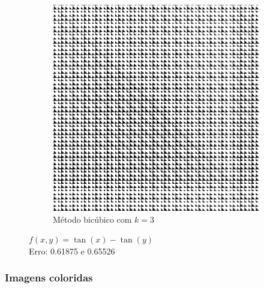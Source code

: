 \documentclass[leqno]{article}
\begin{document}
\begin{figure}[H]
\begin{subfigure}{.33\textwidth}
        \includegraphics[width=.7\linewidth]{../images/func_2_bic.png}
        \caption{Método bicúbico com $k = 3$}
        \label{fig:sub1}
      \end{subfigure}%
    \caption{$f(x,y) = \tan(x) - \tan(y)$ \\ Erro: 0.61875 e 0.65526}
    \label{fig:test}
\end{figure}

\subsubsection*{Imagens coloridas}
\end{document}
